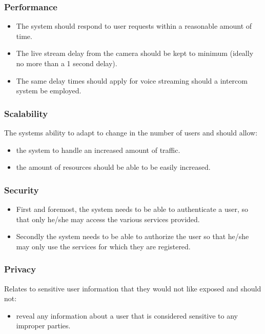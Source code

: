 \documentclass[a4paper,12pt]{article}
\begin{document}
	\subsubsection{Performance}
	\begin{itemize}
		\item The system should respond to user requests within a reasonable amount of time.
		\item The live stream delay from the camera should be kept to minimum (ideally no more than a 1 second delay). 
		\item The same delay times should apply for voice streaming should a intercom system be employed.
	\end{itemize}
	
	\subsubsection{Scalability}
	The systems ability to adapt to change in the number of users and should allow:
	\begin{itemize}
		\item the system to handle an increased amount of traffic.
		\item the amount of resources should be able to be easily increased. 
	\end{itemize}
	
	\subsubsection{Security}
	\begin{itemize}
		\item First and foremost, the system needs to be able to authenticate a user, so that only he/she may access the various services provided.
		\item Secondly the system needs to be able to authorize the user so that he/she may only use the services for which they are registered.
	\end{itemize}
	
	\subsubsection{Privacy}
	Relates to sensitive user information that they would not like exposed and should not:
	\begin{itemize}
		\item reveal any information about a user that is considered sensitive to any improper parties.
	\end{itemize}
	
\end{document}

